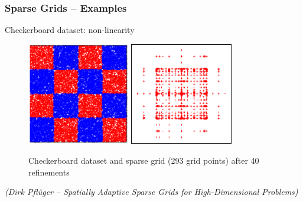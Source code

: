 \begin{frame}
  \frametitle{Sparse Grids -- Examples}
  \topline
  \vspace{-10px}
  \begin{block}{Checkerboard dataset: non-linearity}
    \begin{figure}[!htp]

      \centering
      \includegraphics[width=0.4\textwidth]{images/example_checker1}
      \hspace{10px}
      \includegraphics[width=0.4\textwidth]{images/example_checker2}
      \vspace{-8px}
      \caption{Checkerboard dataset and sparse grid
      (293 grid points) after 40 refinements}
    \end{figure}
    \begin{flushright}
      \tiny{\emph{(Dirk Pflüger -- Spatially Adaptive Sparse Grids for
          High-Dimensional Problems)}}
    \end{flushright}
  \end{block}
\end{frame}

